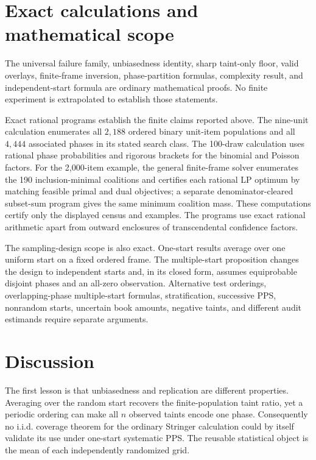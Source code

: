 \documentclass[11pt]{article}
\theoremstyle{definition}
\begin{document}
\section{Exact calculations and mathematical scope}
\label{sec:calculation-boundary}

The universal failure family, unbiasedness identity, sharp taint-only floor,
valid overlays, finite-frame inversion, phase-partition formulas, complexity
result, and independent-start formula are ordinary mathematical proofs.  No
finite experiment is extrapolated to establish those statements.

Exact rational programs establish the finite claims reported above.  The
nine-unit calculation enumerates all $2{,}188$ ordered binary unit-item
populations and all $4{,}444$ associated phases in its stated search class.
The 100-draw calculation uses rational phase probabilities and rigorous
brackets for the binomial and Poisson factors.  For the 2,000-item example,
the general finite-frame solver enumerates the 190 inclusion-minimal
coalitions and certifies each rational LP optimum by matching feasible primal
and dual objectives; a separate denominator-cleared subset-sum program gives
the same minimum coalition mass.  These computations certify only the
displayed census and examples.  The programs use exact rational arithmetic
apart from outward enclosures of transcendental confidence factors.

The sampling-design scope is also exact.  One-start results average over one
uniform start on a fixed ordered frame.  The multiple-start proposition
changes the design to independent starts and, in its closed form, assumes
equiprobable disjoint phases and an all-zero observation.  Alternative test
orderings, overlapping-phase multiple-start formulas, stratification,
successive PPS, nonrandom starts, uncertain book amounts, negative taints,
and different audit estimands require separate arguments.

\section{Discussion}

The first lesson is that unbiasedness and replication are different
properties.  Averaging over the random start recovers the finite-population
taint ratio, yet a periodic ordering can make all $n$ observed taints encode
one phase.  Consequently no i.i.d. coverage theorem for the ordinary
Stringer calculation could by itself validate its use under one-start
systematic PPS.  The reusable statistical object is the mean of each
independently randomized grid.
\end{document}
